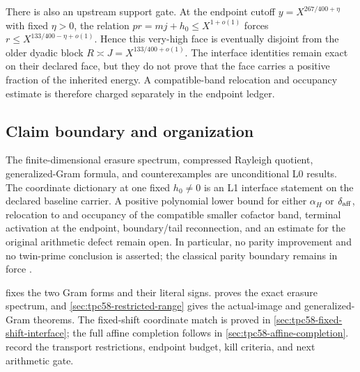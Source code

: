 There is also an upstream support gate.  At the endpoint cutoff
\(y=X^{267/400+\eta}\) with fixed \(\eta>0\), the relation
\(pr=mj+h_0\le X^{1+o(1)}\) forces
\(r\le X^{133/400-\eta+o(1)}\).  Hence this very-high face is eventually
disjoint from the older dyadic block
\(R\asymp J=X^{133/400+o(1)}\).  The interface identities remain exact on
their declared face, but they do not prove that the face carries a positive
fraction of the inherited energy.  A compatible-band relocation and
occupancy estimate is therefore charged separately in the endpoint ledger.

\subsection{Claim boundary and organization}

The finite-dimensional erasure spectrum, compressed Rayleigh quotient,
generalized-Gram formula, and counterexamples are unconditional L0
results.  The coordinate dictionary at one fixed \(h_0\ne0\) is an L1
interface statement on the declared baseline carrier.  A positive
polynomial lower bound for either \(\alpha_H\) or \(\delta_{\rm aff}\),
relocation to and occupancy of the compatible smaller cofactor band,
terminal activation at the endpoint, boundary/tail reconnection, and an
estimate for the original arithmetic defect remain open.  In particular,
no parity improvement and no twin-prime conclusion is asserted; the
classical parity boundary remains in force \citep{FriedlanderIwaniec2010}.

 fixes the two Gram forms and their
literal signs.   proves the exact erasure
spectrum, and \cref{sec:tpc58-restricted-range} gives the actual-image
and generalized-Gram theorems.  The fixed-shift coordinate match is
proved in \cref{sec:tpc58-fixed-shift-interface}; the full affine
completion follows in \cref{sec:tpc58-affine-completion}.
 record the
transport restrictions, endpoint budget, kill criteria, and next
arithmetic gate.
